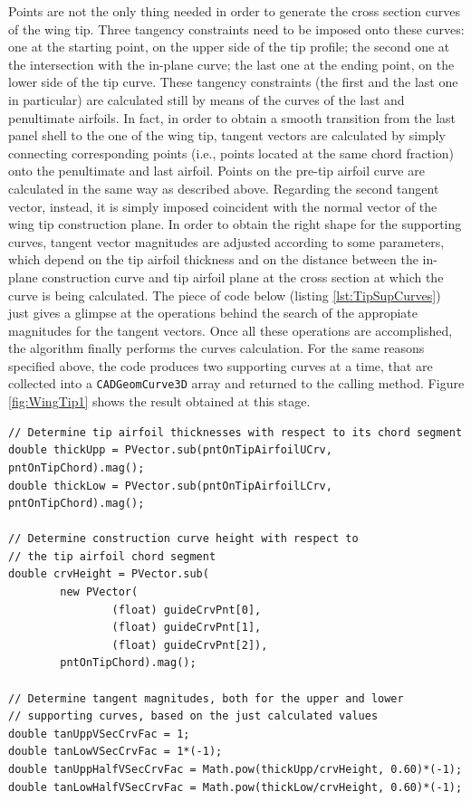 \bigskip
\noindent
Points are not the only thing needed in order to generate the cross section curves of the wing tip. Three tangency constraints need to be imposed onto these curves: one at the starting point, on the upper side of the tip profile; the second one at the intersection with the in-plane curve; the last one at the ending point, on the lower side of the tip curve. These tangency constraints (the first and the last one in particular) are calculated still by means of the curves of the last and penultimate airfoils. In fact, in order to obtain a smooth transition from the last panel shell to the one of the wing tip, tangent vectors are calculated by simply connecting corresponding points (i.e., points located at the same chord fraction) onto the penultimate and last airfoil. Points on the pre-tip airfoil curve are calculated in the same way as described above. Regarding the second tangent vector, instead, it is simply imposed coincident with the normal vector of the wing tip construction plane. In order to obtain the right shape for the supporting curves, tangent vector magnitudes are adjusted according to some parameters, which depend on the tip airfoil thickness and on the distance between the in-plane construction curve and tip airfoil plane at the cross section at which the curve is being calculated. The piece of code below (listing \ref{lst:TipSupCurves}) just gives a glimpse at the operations behind the search of the appropiate magnitudes for the tangent vectors. Once all these operations are accomplished, the algorithm finally performs the curves calculation. For the same reasons specified above, the code produces two supporting curves at a time, that are collected into a \lstinline[language=Java]!CADGeomCurve3D! array and returned to the calling method. Figure \ref{fig:WingTip1} shows the result obtained at this stage.
%
\bigskip
\begin{lstlisting}[caption={Tip supporting curves tangent vectors magnitudes}, captionpos=b, tabsize=2, label={lst:TipSupCurves}]
// Determine tip airfoil thicknesses with respect to its chord segment
double thickUpp = PVector.sub(pntOnTipAirfoilUCrv, pntOnTipChord).mag();
double thickLow = PVector.sub(pntOnTipAirfoilLCrv, pntOnTipChord).mag();

// Determine construction curve height with respect to
// the tip airfoil chord segment
double crvHeight = PVector.sub(
		new PVector(
				(float) guideCrvPnt[0], 
				(float) guideCrvPnt[1], 
				(float) guideCrvPnt[2]), 		
		pntOnTipChord).mag(); 

// Determine tangent magnitudes, both for the upper and lower
// supporting curves, based on the just calculated values	
double tanUppVSecCrvFac = 1;
double tanLowVSecCrvFac = 1*(-1);		
double tanUppHalfVSecCrvFac = Math.pow(thickUpp/crvHeight, 0.60)*(-1); 
double tanLowHalfVSecCrvFac = Math.pow(thickLow/crvHeight, 0.60)*(-1);
\end{lstlisting}
